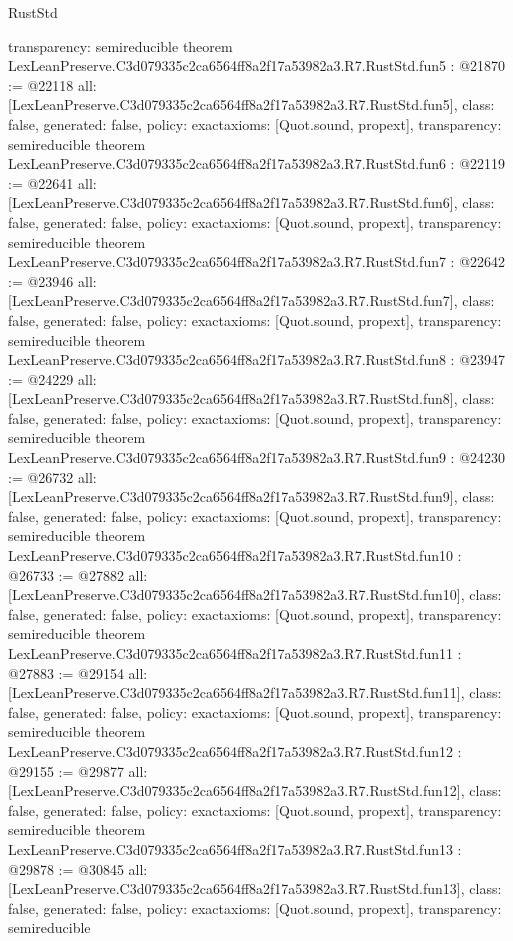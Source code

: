 \begin{lexlean}{RustStd}
\begin{coremodule}
{  transparency: semireducible
}
theorem LexLeanPreserve.C3d079335c2ca6564ff8a2f17a53982a3.R7.RustStd.fun5 : @21870 := @22118 {
  all: [LexLeanPreserve.C3d079335c2ca6564ff8a2f17a53982a3.R7.RustStd.fun5],
  class: false,
  generated: false,
  policy: exact{axioms: [Quot.sound, propext]},
  transparency: semireducible
}
theorem LexLeanPreserve.C3d079335c2ca6564ff8a2f17a53982a3.R7.RustStd.fun6 : @22119 := @22641 {
  all: [LexLeanPreserve.C3d079335c2ca6564ff8a2f17a53982a3.R7.RustStd.fun6],
  class: false,
  generated: false,
  policy: exact{axioms: [Quot.sound, propext]},
  transparency: semireducible
}
theorem LexLeanPreserve.C3d079335c2ca6564ff8a2f17a53982a3.R7.RustStd.fun7 : @22642 := @23946 {
  all: [LexLeanPreserve.C3d079335c2ca6564ff8a2f17a53982a3.R7.RustStd.fun7],
  class: false,
  generated: false,
  policy: exact{axioms: [Quot.sound, propext]},
  transparency: semireducible
}
theorem LexLeanPreserve.C3d079335c2ca6564ff8a2f17a53982a3.R7.RustStd.fun8 : @23947 := @24229 {
  all: [LexLeanPreserve.C3d079335c2ca6564ff8a2f17a53982a3.R7.RustStd.fun8],
  class: false,
  generated: false,
  policy: exact{axioms: [Quot.sound, propext]},
  transparency: semireducible
}
theorem LexLeanPreserve.C3d079335c2ca6564ff8a2f17a53982a3.R7.RustStd.fun9 : @24230 := @26732 {
  all: [LexLeanPreserve.C3d079335c2ca6564ff8a2f17a53982a3.R7.RustStd.fun9],
  class: false,
  generated: false,
  policy: exact{axioms: [Quot.sound, propext]},
  transparency: semireducible
}
theorem LexLeanPreserve.C3d079335c2ca6564ff8a2f17a53982a3.R7.RustStd.fun10 : @26733 := @27882 {
  all: [LexLeanPreserve.C3d079335c2ca6564ff8a2f17a53982a3.R7.RustStd.fun10],
  class: false,
  generated: false,
  policy: exact{axioms: [Quot.sound, propext]},
  transparency: semireducible
}
theorem LexLeanPreserve.C3d079335c2ca6564ff8a2f17a53982a3.R7.RustStd.fun11 : @27883 := @29154 {
  all: [LexLeanPreserve.C3d079335c2ca6564ff8a2f17a53982a3.R7.RustStd.fun11],
  class: false,
  generated: false,
  policy: exact{axioms: [Quot.sound, propext]},
  transparency: semireducible
}
theorem LexLeanPreserve.C3d079335c2ca6564ff8a2f17a53982a3.R7.RustStd.fun12 : @29155 := @29877 {
  all: [LexLeanPreserve.C3d079335c2ca6564ff8a2f17a53982a3.R7.RustStd.fun12],
  class: false,
  generated: false,
  policy: exact{axioms: [Quot.sound, propext]},
  transparency: semireducible
}
theorem LexLeanPreserve.C3d079335c2ca6564ff8a2f17a53982a3.R7.RustStd.fun13 : @29878 := @30845 {
  all: [LexLeanPreserve.C3d079335c2ca6564ff8a2f17a53982a3.R7.RustStd.fun13],
  class: false,
  generated: false,
  policy: exact{axioms: [Quot.sound, propext]},
  transparency: semireducible
}
\end{coremodule}
\end{lexlean}
